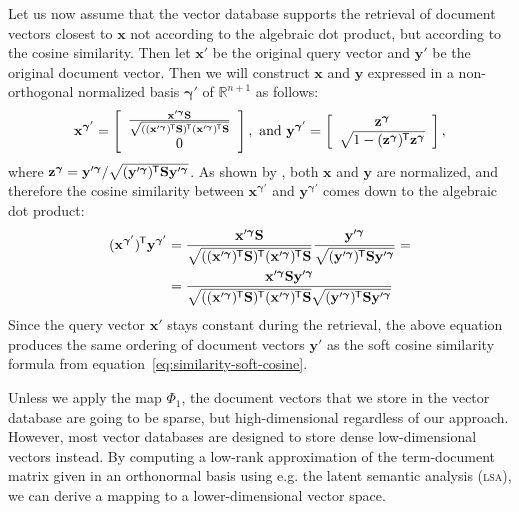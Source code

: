 \documentclass[
  digital, %
  notable, %
  lof,     %
  lot,     %
  nopalatino, color
]{fithesis3}
\def\abbr#1{\textsc{\MakeLowercase{#1}}}
\newcommand*{\tran}{^{\mkern-1.5mu\mathsf{T}}}
\begin{document}
Let us now assume that the vector database supports the retrieval of document
vectors closest to $\mathbf x$ not according to the algebraic dot product, but
according to the cosine similarity. Then let $\mathbf
x'$ be the original query vector and $\mathbf y'$ be the original document
vector. Then we will construct $\mathbf x$ and $\mathbf y$ expressed in a
non-orthogonal normalized basis $\bm\gamma'$ of
$\mathbb{R}^{n+1}$ as follows:
\begin{equation*}
  \mathbf x^{\bm\gamma'} = \left[\begin{array}{c}\frac{\mathbf x'^{\bm\gamma}\mathbf S}{\sqrt{((\mathbf x'^{\bm\gamma})\tran\mathbf S)\tran(\mathbf x'^{\bm\gamma})\tran\mathbf S}} \\ 0\end{array}\right],\text{ and }
  \mathbf y^{\bm\gamma'} = \left[\begin{array}{c}\mathbf z^{\bm\gamma} \\ \sqrt{1-(\mathbf z^{\bm\gamma})\tran\mathbf z^{\bm\gamma}}\end{array}\right],
\end{equation*}
where $\mathbf z^{\bm\gamma} = \mathbf y'^{\bm\gamma} / \sqrt{(\mathbf y'^{\bm\gamma})\tran\mathbf S\mathbf y'^{\bm\gamma}}$.
As shown by \textcite[sec.~4.3]{neyshabur2015symmetric}, both $\mathbf x$ and
$\mathbf y$ are normalized, and therefore the cosine similarity between $\mathbf x^{\bm\gamma'}$ and $\mathbf y^{\bm\gamma'}$ comes
down to the algebraic dot product:
\begin{align*}
  (\mathbf x^{\bm\gamma'})\tran\mathbf y^{\bm\gamma'}
  &= \frac{\mathbf x'^{\bm\gamma}\mathbf S}{\sqrt{((\mathbf x'^{\bm\gamma})\tran\mathbf S)\tran(\mathbf x'^{\bm\gamma})\tran\mathbf S}}
  \frac{\mathbf y'^{\bm\gamma}}{\sqrt{(\mathbf y'^{\bm\gamma})\tran\mathbf S\mathbf y'^{\bm\gamma}}} = \\
  &= \frac{\mathbf x'^{\bm\gamma}\mathbf S\mathbf y'^{\bm\gamma}}{\sqrt{((\mathbf x'^{\bm\gamma})\tran\mathbf S)\tran(\mathbf x'^{\bm\gamma})\tran\mathbf S}\sqrt{(\mathbf y'^{\bm\gamma})\tran\mathbf S\mathbf y'^{\bm\gamma}}}
\end{align*}
Since the query vector $\mathbf x'$ stays constant during the retrieval, the above
equation produces the same ordering of document vectors $\mathbf y'$ as the soft
cosine similarity formula from equation~\ref{eq:similarity-soft-cosine}.

Unless we apply the map $\Phi_1$, the document vectors that we
store in the vector database are going to be sparse, but high-dimensional
regardless of our approach. However, most vector databases are designed to
store dense low-dimensional vectors instead. By computing a low-rank
approximation of the term-document matrix given in an orthonormal basis using
e.g.  the latent semantic analysis (\abbr{LSA})\index{LSA@\abbr{LSA}}, we can
derive a mapping to a lower-dimensional vector space.
\end{document}
